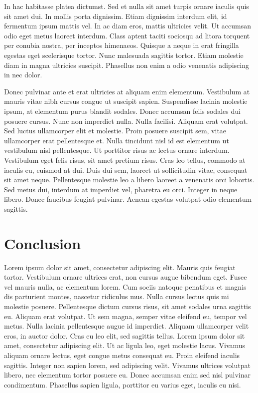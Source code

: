 \documentclass{EPUProjetDi}
\begin{document}
In hac habitasse platea dictumst. Sed et nulla sit amet turpis ornare iaculis quis sit amet dui. In mollis porta dignissim. Etiam dignissim interdum elit, id fermentum ipsum mattis vel. In ac diam eros, mattis ultricies velit. Ut accumsan odio eget metus laoreet interdum. Class aptent taciti sociosqu ad litora torquent per conubia nostra, per inceptos himenaeos. Quisque a neque in erat fringilla egestas eget scelerisque tortor. Nunc malesuada sagittis tortor. Etiam molestie diam in magna ultricies suscipit. Phasellus non enim a odio venenatis adipiscing in nec dolor.

Donec pulvinar ante et erat ultricies at aliquam enim elementum. Vestibulum at mauris vitae nibh cursus congue ut suscipit sapien. Suspendisse lacinia molestie ipsum, at elementum purus blandit sodales. Donec accumsan felis sodales dui posuere cursus. Nunc non imperdiet nulla. Nulla facilisi. Aliquam erat volutpat. Sed luctus ullamcorper elit et molestie. Proin posuere suscipit sem, vitae ullamcorper erat pellentesque et. Nulla tincidunt nisl id est elementum ut vestibulum nisl pellentesque. Ut porttitor risus ac lectus ornare interdum. Vestibulum eget felis risus, sit amet pretium risus. Cras leo tellus, commodo at iaculis eu, euismod at dui. Duis dui sem, laoreet ut sollicitudin vitae, consequat sit amet neque. Pellentesque molestie leo a libero laoreet a venenatis orci lobortis. Sed metus dui, interdum at imperdiet vel, pharetra eu orci. Integer in neque libero. Donec faucibus feugiat pulvinar. Aenean egestas volutpat odio elementum sagittis.

\chapter*{Conclusion}

\label{sec:conclusion}
Lorem ipsum dolor sit amet, consectetur adipiscing elit. Mauris quis feugiat tortor. Vestibulum ornare ultrices erat, non cursus augue bibendum eget. Fusce vel mauris nulla, ac elementum lorem. Cum sociis natoque penatibus et magnis dis parturient montes, nascetur ridiculus mus. Nulla cursus lectus quis mi molestie posuere. Pellentesque dictum cursus risus, sit amet sodales urna sagittis eu. Aliquam erat volutpat. Ut sem magna, semper vitae eleifend eu, tempor vel metus. Nulla lacinia pellentesque augue id imperdiet. Aliquam ullamcorper velit eros, in auctor dolor. Cras eu leo elit, sed sagittis tellus. Lorem ipsum dolor sit amet, consectetur adipiscing elit. Ut ac ligula leo, eget molestie lacus. Vivamus aliquam ornare lectus, eget congue metus consequat eu. Proin eleifend iaculis sagittis. Integer non sapien lorem, sed adipiscing velit. Vivamus ultrices volutpat libero, nec elementum tortor posuere eu. Donec accumsan enim sed nisl pulvinar condimentum. Phasellus sapien ligula, porttitor eu varius eget, iaculis eu nisi.
\end{document}
